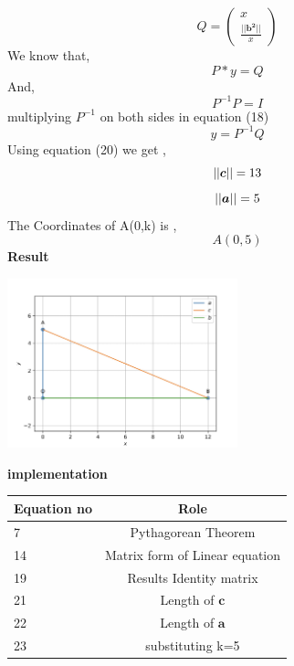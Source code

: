 \documentclass[10pt,a4paper]{report}
\begin{document}
\begin{multicols}{2}
\begin{equation}
  Q = \begin{pmatrix}
x\\
\frac{ ||\boldsymbol{b^2}||}{x}
\end{pmatrix} 
\end{equation}\vspace{2mm}
We know that,\\
\begin{equation}
P * y = Q
\end{equation}
And,\\
\begin{equation}
P^{-1} P = I
\end{equation}
multiplying $P^{-1}$ on both sides in equation (18)\\
\begin{equation}
 y = P^{-1} Q
\end{equation}
Using equation (20) we get ,
\begin{equation}
    ||\boldsymbol{c}|| = 13 \vspace{2mm}
\end{equation}
\begin{equation}
  ||\boldsymbol{a}|| = 5 \vspace{2mm}
\end{equation}
The Coordinates of A(0,k) is ,
\begin{equation}
  A(0,5)
\end{equation}
\textbf{Result} 
\begin{center}
 \includegraphics[width=0.5\textwidth]{matrix.jpg}  
 \end{center}\vspace{5mm}
 \vspace{2mm}  
\textbf{implementation}
\begin{center}
\setlength{\arrayrulewidth}{0.5mm}
\setlength{\tabcolsep}{5pt}
\renewcommand{\arraystretch}{3}
    \begin{tabular}{|l|c|}
    \hline 
    \textbf{Equation no} & \textbf{Role} \\ \hline
    7 &  Pythagorean Theorem \\ 
    14 & Matrix form of Linear equation  \\
    19 & Results Identity matrix  \\
    21 & Length of $\boldsymbol{c}$\\
    22 & Length of $\boldsymbol{a}$\\
    23 & substituting k=5\\
    \hline
      \end{tabular}
  \end{center} \vspace{2mm}
  

\end{multicols}
\end{document}
